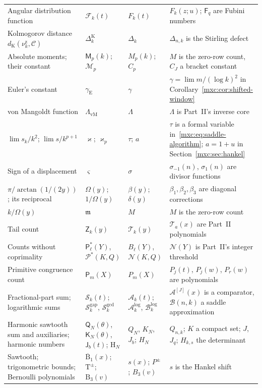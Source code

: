 \documentclass[11pt]{article}
\numberwithin{equation}{section}
\theoremstyle{definition}
\theoremstyle{remark}
\newcommand{\hznu}{\nu^{\mathrm z}}
\newcommand{\Cau}{\mathcal C}
\newcommand{\dK}{d_{\mathrm K}}
\newcommand{\gE}{\gamma_{\mathrm E}}
\newcommand{\vM}{\Lambda_{\mathrm{vM}}}
\begin{document}
{\begin{longtable}{@{}>{\raggedright\arraybackslash}p{}>{\raggedright\arraybackslash}p{}>{\raggedright\arraybackslash}p{}>{\raggedright\arraybackslash}p{}@{}}
Angular distribution function & $\mathcal F_k(t)$ & $F_k(t)$ & $F_k(z;u)$; $\mathsf F_q$ are Fubini numbers\\
Kolmogorov distance $\dK(\hznu_k,\Cau)$ & $\Delta^{\mathrm K}_k$ & $\Delta_k$ & $\Delta_{n,k}$ is the Stirling defect\\
Absolute moments; their constant & $\mathsf M_p(k)$; $\mathcal M_p$ & $M_p(k)$; $C_p$ & $M$ is the zero-row count, $C_J$ a bracket constant\\
Euler's constant & $\gE$ & $\gamma$ & $\gamma=\lim m/(\log k)^2$ in Corollary~\ref{mxc:cor:shifted-window}\\
von Mangoldt function & $\vM$ & $\Lambda$ & $\Lambda$ is Part~II's inverse core\\
$\lim s_k/k^2$; $\lim s/k^{p+1}$ & $\varkappa$; $\varkappa_p$ & $\tau$; $a$ & $\tau$ is a formal variable in~\eqref{mxc:eq:saddle-algorithm}; $a=1+u$ in Section~\ref{mxc:sec:hankel}\\
Sign of a displacement & $\varsigma$ & $\sigma$ & $\sigma_{-1}(n)$, $\sigma_1(n)$ are divisor functions\\
$\pi/\arctan(1/(2y))$; its reciprocal & $\Omega(y)$; $1/\Omega(y)$ & $\beta(y)$; $\delta(y)$ & $\beta_1,\beta_2,\beta_3$ are diagonal corrections\\
$k/\Omega(y)$ & $\mathfrak m$ & $M$ & $M$ is the zero-row count\\
Tail count & $\mathsf Z_k(y)$ & $\mathcal T_k(y)$ & $\mathcal T_a(x)$ are Part~II polynomials\\
Counts without coprimality & $\mathsf P^\ast_\ell(Y)$, $\mathcal P^\ast(K,Q)$ & $B_\ell(Y)$, $\mathcal N(K,Q)$ & $\mathcal N(Y)$ is Part~II's integer threshold\\
Primitive congruence count & $\mathsf P_m(X)$ & $P_m(X)$ & $P_j(t)$, $P_j(w)$, $P_r(w)$ are polynomials\\
Fractional-part sum; logarithmic sums & $\mathcal S_k(t)$; $\mathcal S^{\mathrm{gap}}_k$, $\mathcal S^{\gcd}_k$ & $\mathcal A_k(t)$; $\mathcal A^{\log}_k$, $\mathcal B^{\log}_k$ & $\mathcal A^{[J]}(x)$ is a comparator, $\mathcal B(n,k)$ a saddle approximation\\
Harmonic sawtooth sum and auxiliaries; harmonic numbers & $\mathsf Q_N(\theta)$, $\mathsf K_N(\theta)$, $\mathsf J_b(t)$; $\mathrm H_N$ & $Q_N$, $K_N$, $J_b$; $H_N$ & $Q_{n,k}$; $K$ a compact set; $J$, $J_q$; $H_{k,s}$ the determinant\\
Sawtooth; trigonometric bounds; Bernoulli polynomials & $\overline{\mathrm B}_1(x)$; $\mathrm T^\pm$; $\mathrm B_3(v)$ & $s(x)$; $P^\pm$; $B_3(v)$ & $s$ is the Hankel shift\\

\end{longtable}}
\end{document}
